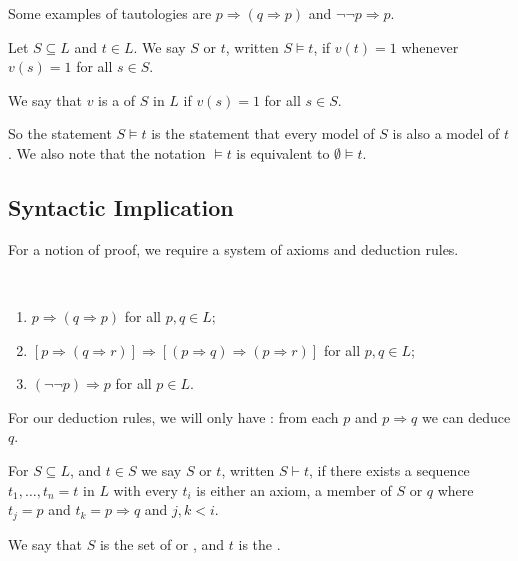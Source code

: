 \documentclass[a4paper, 10pt, twocolumn]{amsart}
\newcommand{\enumpre}{\vspace{-1.5\baselineskip}}
\begin{document}
Some examples of tautologies are $p \Rightarrow (q \Rightarrow p)$ and $\lnot \lnot p \Rightarrow p$.

\begin{definition}
  Let $S \subseteq L$ and $t \in L$. We say $S$  or  $t$, written $S \models t$, if $v(t) = 1$ whenever $v(s) = 1$ for all $s \in S$.
\end{definition}
\begin{definition}[Model]
  We say that $v$ is a  of $S$ in $L$ if $v(s) = 1$ for all $s \in S$.
\end{definition}

So the statement $S \models t$ is the statement that every model of $S$ is also a model of $t$. We also note that the notation $\models t$ is equivalent to $\emptyset \models t$.

\subsection{Syntactic Implication}

For a notion of proof, we require a system of axioms and deduction rules.

\begin{axiom}~
  \enumpre
  \begin{enumerate}
    \item $p \Rightarrow (q \Rightarrow p)$ for all $p, q \in L$;
    \item $[p \Rightarrow (q \Rightarrow r)] \Rightarrow [(p \Rightarrow q) \Rightarrow (p \Rightarrow r)]$ for all $p, q \in L$;
    \item $(\lnot \lnot p) \Rightarrow p$ for all $p \in L$.
  \end{enumerate}
\end{axiom}

For our deduction rules, we will only have : from each $p$ and $p \Rightarrow q$ we can deduce $q$.

\begin{definition}
  For $S \subseteq L$, and $t \in S$ we say $S$  or  $t$, written $S \vdash t$, if there exists a sequence $t_1, \dots, t_n=t$ in $L$ with every $t_i$ is either an axiom, a member of $S$ or $q$ where $t_j = p$ and $t_k = p \Rightarrow q$ and $j, k < i$.

  We say that $S$ is the set of  or , and $t$ is the .
\end{definition}
\end{document}
